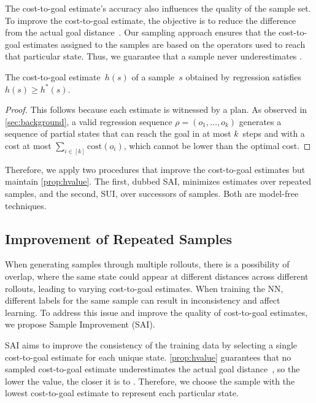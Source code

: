The cost-to-goal estimate's accuracy also influences the quality of the sample set. To improve the cost-to-goal estimate, the objective is to reduce the difference from the actual goal distance~\hstar. Our sampling approach ensures that the cost-to-goal estimates assigned to the samples are based on the operators used to reach that particular state. Thus, we guarantee that a sample never underestimates \hstar.

\begin{property}
    \label{prop:hvalue}
    The cost-to-goal estimate~$h(s)$ of a sample~$s$ obtained by regression satisfies $h(s)\geq h^*(s)$.
\end{property}
\begin{proof}
    This follows because each estimate is witnessed by a plan. As observed in \cref{sec:background}, a valid regression sequence $\rho=(o_1,\ldots,o_k)$ generates a sequence of partial states that can reach the goal in at most $k$~steps and with a cost at most $\sum_{i\in[k]}\text{cost}(o_i)$, which cannot be lower than the optimal cost.
\end{proof}

Therefore, we apply two procedures that improve the cost-to-goal estimates but maintain \cref{prop:hvalue}. The first, dubbed SAI, minimizes estimates over repeated samples, and the second, SUI, over successors of samples. Both are model-free techniques.

\subsection{Improvement of Repeated Samples}
\label{sec:sai}

When generating samples through multiple rollouts, there is a possibility of overlap, where the same state could appear at different distances across different rollouts, leading to varying cost-to-goal estimates. When training the NN, different labels for the same sample can result in inconsistency and affect learning. To address this issue and improve the quality of cost-to-goal estimates, we propose Sample Improvement (SAI).

SAI aims to improve the consistency of the training data by selecting a single cost-to-goal estimate for each unique state. \cref{prop:hvalue} guarantees that no sampled cost-to-goal estimate underestimates the actual goal distance~\hstar, so the lower the value, the closer it is to \hstar. Therefore, we choose the sample with the lowest cost-to-goal estimate to represent each particular state.


